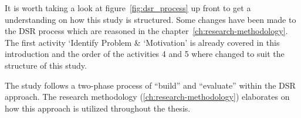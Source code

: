 It is worth taking a look at figure~\ref{fig:dsr_process} up front to get a understanding on how this study is
structured.
Some changes have been made to the DSR process which are reasoned in the chapter~\ref{ch:research-methodology}.
The first activity `Identify Problem \& `Motivation' is already covered in this introduction and the order of the
activities 4 and 5 where changed to suit the structure of this study.

The study follows a two-phase process of ``build'' and ``evaluate'' within the DSR approach.
The research methodology (\cref{ch:research-methodology}) elaborates on how this approach is
utilized throughout the thesis.


